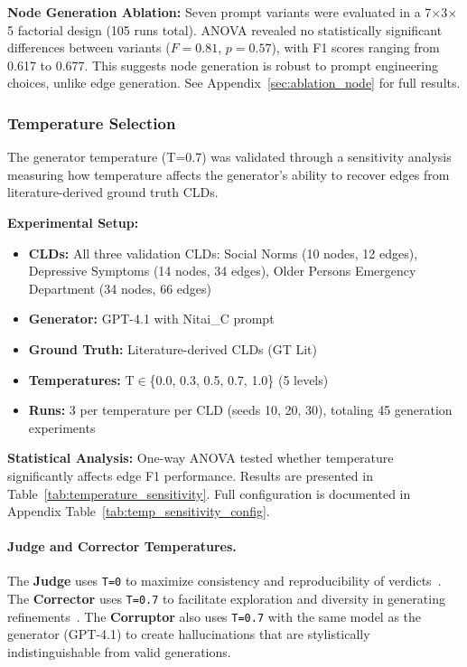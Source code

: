 \textbf{Node Generation Ablation:} Seven prompt variants were evaluated in a 7$\times$3$\times$5 factorial design (105 runs total). ANOVA revealed no statistically significant differences between variants ($F=0.81$, $p=0.57$), with F1 scores ranging from 0.617 to 0.677. This suggests node generation is robust to prompt engineering choices, unlike edge generation. See Appendix~\ref{sec:ablation_node} for full results.

\subsubsection{Temperature Selection}

The generator temperature (T=0.7) was validated through a sensitivity analysis measuring how temperature affects the generator's ability to recover edges from literature-derived ground truth CLDs.

\textbf{Experimental Setup:}
\begin{itemize}[noitemsep]
    \item \textbf{CLDs:} All three validation CLDs: Social Norms (10 nodes, 12 edges), Depressive Symptoms (14 nodes, 34 edges), Older Persons Emergency Department (34 nodes, 66 edges)
    \item \textbf{Generator:} GPT-4.1 with Nitai\_C prompt
    \item \textbf{Ground Truth:} Literature-derived CLDs (GT Lit)
    \item \textbf{Temperatures:} T$\in$\{0.0, 0.3, 0.5, 0.7, 1.0\} (5 levels)
    \item \textbf{Runs:} 3 per temperature per CLD (seeds 10, 20, 30), totaling 45 generation experiments
\end{itemize}

\textbf{Statistical Analysis:} One-way ANOVA tested whether temperature significantly affects edge F1 performance. Results are presented in Table~\ref{tab:temperature_sensitivity}. Full configuration is documented in Appendix Table~\ref{tab:temp_sensitivity_config}.

\paragraph{Judge and Corrector Temperatures.}
The \textbf{Judge} uses \texttt{T=0} to maximize consistency and reproducibility of verdicts~\citep{liu2023gevalnlgevaluationusing, zheng2024judging}. The \textbf{Corrector} uses \texttt{T=0.7} to facilitate exploration and diversity in generating refinements~\citep{madaan2023selfrefineiterativerefinementselffeedback}. The \textbf{Corruptor} also uses \texttt{T=0.7} with the same model as the generator (GPT-4.1) to create hallucinations that are stylistically indistinguishable from valid generations.

